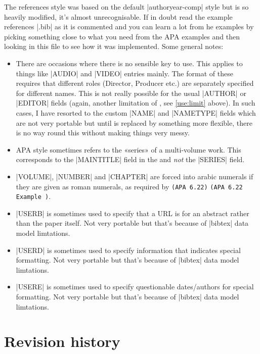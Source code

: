\documentclass{ltxdockit}
\newcommand\apa[2][]{\ifthenelse{\equal{#1}{}}%
                       {\texttt{(APA #2)}}%
                       {\texttt{(APA #2 Example #1)}}}
\begin{document}
The references style was based on the  default
|authoryear-comp| style but is so heavily modified, it's almost
unrecognisable. If in doubt read the example references |.bib| as it is
commented and you can learn a lot from he examples by picking something
close to what you need from the APA examples and then looking in this file
to see how it was implemented. Some general notes:
\begin{itemize}
\setlength{\itemsep}{0pt}
\item There are occasions where there is no sensible  key to
  use. This applies to things like |AUDIO| and |VIDEO| entries mainly. The
  format of these requires that different roles (Director, Producer etc.)
  are separately specified for different names. This is not really possible
  for the usual |AUTHOR| or |EDITOR| fields (again, another limitation of
  \bibtex, see \ref{use:limit} above). In such cases, I have resorted to
  the  custom |NAME| and |NAMETYPE| fields which are not very
  portable but until \bibtex is replaced by something more flexible, there
  is no way round this without making things very messy.
\item APA style sometimes refers to the «series» of a multi-volume work.
  This corresponds to the |MAINTITLE| field in the  and
  \emph{not} the |SERIES| field.
\item |VOLUME|, |NUMBER| and |CHAPTER| are forced into arabic numerals if
  they are given as roman numerals, as required by \apa{6.22}.
\item |USERB| is sometimes used to specify that a URL is for an abstract
  rather than the paper itself. Not very portable but that's because of |bibtex| data
  model limtations.
\item |USERD| is sometimes used to specify information that indicates
  special formatting. Not very portable but that's because of |bibtex| data
  model limtations.
\item |USERE| is sometimes used to specify questionable dates/authors for
  special formatting. Not very portable but that's because of |bibtex| data
  model limtations.
\end{itemize}

\section{Revision history}
\end{document}
